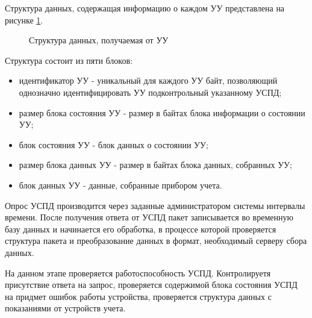 Структура данных, содержащая информацию о каждом УУ представлена на рисунке \ref{img:UU_struct}.

\begin{figure}[!ht]
 \caption{Структура данных, получаемая от УУ}
 \label{img:UU_struct}
\end{figure}

Структура состоит из пяти блоков:

\begin{itemize}
 \item идентификатор УУ - уникальный для каждого УУ байт, позволяющий однозначно идентифицировать УУ подконтрольный указанному УСПД;
 \item размер блока состояния УУ - размер в байтах блока информации о состоянии УУ;
 \item блок состояния УУ - блок данных о состоянии УУ;
 \item размер блока данных УУ - размер в байтах блока данных, собранных УУ;
 \item блок данных УУ - данные, собранные прибором учета.
\end{itemize}

Опрос УСПД производится через заданные администратором системы интервалы времени. После получения ответа от УСПД пакет записывается во временную базу данных и начинается его обработка, в процессе которой проверяется структура пакета и преобразование данных в формат, необходимый серверу сбора данных.

На данном этапе проверяется работоспособность УСПД. Контролируетя присутствие ответа на запрос, проверяется содержимой блока состояния УСПД на придмет ошибок работы устройства, проверяется структура данных с показаниями от устройств учета.